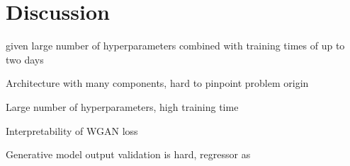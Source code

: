 \chapter{Discussion}

given large number of hyperparameters combined with training times of up to two days

Architecture with many components, hard to pinpoint problem origin

Large number of hyperparameters, high training time

Interpretability of WGAN loss

Generative model output validation is hard, regressor as 
